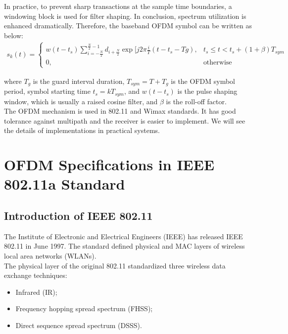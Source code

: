 In practice, to prevent sharp transactions at the sample time boundaries, a windowing block is used for filter shaping. In conclusion, spectrum utilization is enhanced dramatically. Therefore, the baseband OFDM symbol can be written as below:\\
\begin{equation} \label{ofdm_window}
\begin{split}
s_{k}(t)=
\left\{
	\begin{array}{ll}
	w(t - t_{s})\sum\limits_{i=-\frac{N}{2}}^{\frac{N}{2}-1} d_{i+\frac{N}{2}} \exp\lbrack j2\pi\frac{i}{T}(t- t_{s}- T{g}) , & t_{s}\le t < t_{s} + (1+\beta)T_{sym}\\
	0, & \mbox{otherwise}
	\end{array}
\right.
\end{split}
\end{equation}

where $T_{g}$ is the guard interval duration, $T_{sym}= T+ T_{g}$ is the OFDM symbol period,
symbol starting time $t_{s}= kT_{sym}$, and $w(t-t_{s})$ is the pulse shaping window, which is
usually a raised cosine filter, and $\beta$ is the roll-off factor.\\
The OFDM mechanism is used in 802.11 and Wimax standards. It has good tolerance against multipath and the receiver is easier to implement. We will see the details of implementations in practical systems.\\


\section{OFDM Specifications in IEEE 802.11a Standard}

\subsection{Introduction of IEEE 802.11}
The Institute of Electronic and Electrical Engineers (IEEE) has released IEEE 802.11 in June 1997. The standard defined physical and MAC layers of wireless local area networks (WLANs).\\
The physical layer of the original 802.11 standardized three wireless data exchange techniques:

\begin{itemize}
  \item Infrared (IR);
  \item Frequency hopping spread spectrum (FHSS);
  \item Direct sequence spread spectrum (DSSS).
\end{itemize}


